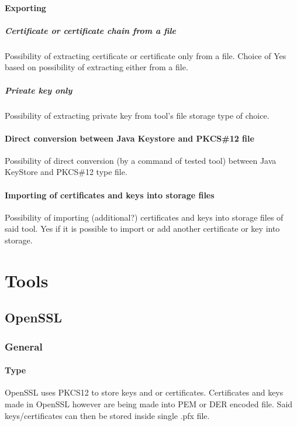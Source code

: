 \documentclass[10pt, a4paper]{report}
\begin{document}
\subsection{Exporting}

\subsubsection{Certificate or certificate chain from a file}
Possibility of extracting certificate or certificate only from a file. Choice of Yes based on possibility of extracting either from a file.

\subsubsection{Private key only}
Possibility of extracting private key from tool's file storage type of choice.

\subsection{Direct conversion between Java Keystore and PKCS\#12 file}
Possibility of direct conversion (by a command of tested tool) between Java KeyStore and PKCS\#12 type file.

\subsection{Importing of certificates and keys into storage files}
Possibility of importing (additional?) certificates and keys into storage files of said tool. Yes if it is possible to import or add another certificate or key into storage.


\newpage
\part{Tools}

\chapter{OpenSSL}

\section{General}

  \subsection{Type}
  OpenSSL uses PKCS12 to store keys and or certificates. Certificates and keys  made in OpenSSL however are being made into PEM or DER encoded file. Said keys/certificates can then be stored inside single .pfx file. 
  
\end{document}
